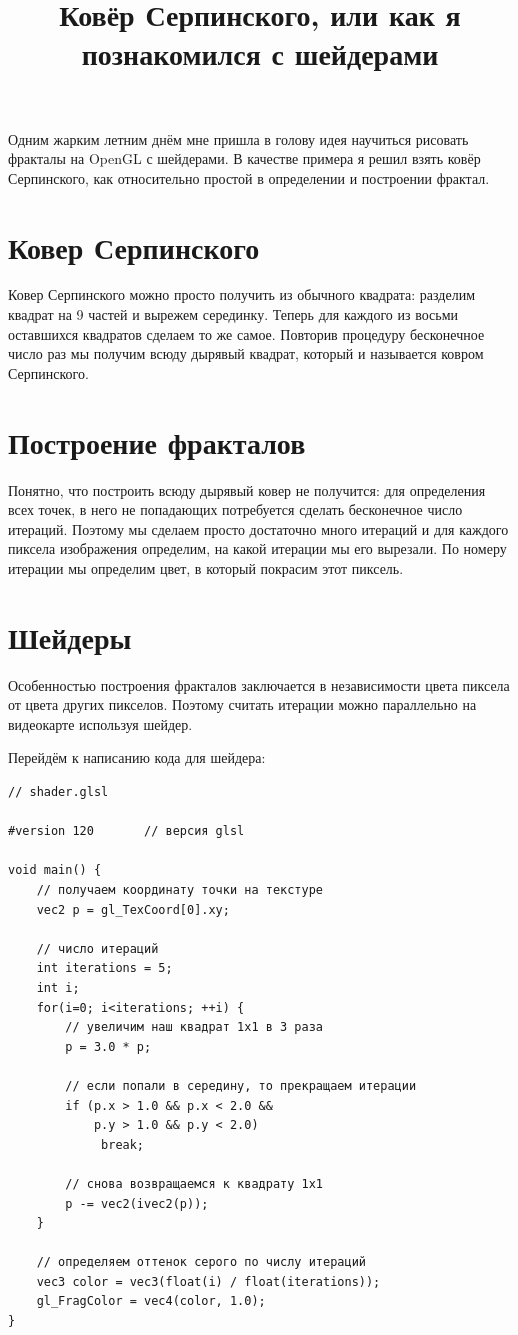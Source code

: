 \documentclass{ncc}
\title{Ковёр Серпинского, или как я познакомился с шейдерами}
\begin{document}
\maketitle
\tableofcontents
Одним жарким летним днём мне пришла в голову идея научиться рисовать фракталы на OpenGL с шейдерами. В качестве примера я решил взять ковёр Серпинского, как относительно простой в определении и построении фрактал.

\section{Ковер Серпинского}

Ковер Серпинского можно просто получить из обычного квадрата: разделим квадрат на 9 частей и вырежем серединку. Теперь для каждого из восьми оставшихся квадратов сделаем то же самое. Повторив процедуру бесконечное число раз мы получим всюду дырявый квадрат, который и называется ковром Серпинского.


\section{Построение фракталов}

Понятно, что построить всюду дырявый ковер не получится: для определения всех точек, в него не попадающих потребуется сделать бесконечное число итераций. Поэтому мы сделаем просто достаточно много итераций и для каждого пиксела изображения определим, на какой итерации мы его вырезали. По номеру итерации мы определим цвет, в который покрасим этот пиксель.

\section{Шейдеры}

Особенностью построения фракталов заключается в независимости цвета пиксела от цвета других пикселов. Поэтому считать итерации можно параллельно на видеокарте используя шейдер.

Перейдём к написанию кода для шейдера:

\begin{lstlisting}
// shader.glsl

#version 120       // версия glsl

void main() {
    // получаем координату точки на текстуре
    vec2 p = gl_TexCoord[0].xy;

    // число итераций
    int iterations = 5;
    int i;
    for(i=0; i<iterations; ++i) {
        // увеличим наш квадрат 1х1 в 3 раза
        p = 3.0 * p;

        // если попали в середину, то прекращаем итерации
        if (p.x > 1.0 && p.x < 2.0 &&
            p.y > 1.0 && p.y < 2.0)
             break;

        // снова возвращаемся к квадрату 1x1
        p -= vec2(ivec2(p));
    }

    // определяем оттенок серого по числу итераций
    vec3 color = vec3(float(i) / float(iterations));
    gl_FragColor = vec4(color, 1.0);
}
\end{lstlisting}
\end{document}

